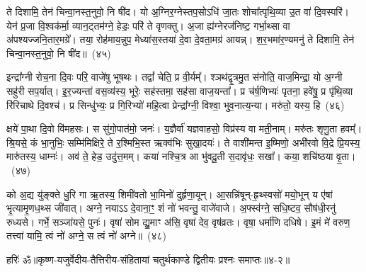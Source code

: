 ते दिशामि॒ तेन॑ चिन्वा॒नस्त॒नुवो॒ नि षी॑द। यो अ॒ग्निर॒ग्नेस्तप॒सो\-ऽधि॑ जा॒तः शोचा᳚त्पृथि॒व्या उ॒त वा॑ दि॒वस्परि॑। येन॑ प्र॒जा वि॒श्वक॑र्मा॒ व्यान॒ट्तम॑ग्ने॒ हेडः॒ परि॑ ते वृणक्तु। अ॒जा ह्य॑ग्नेरज॑निष्ट॒ गर्भा॒थ्सा वा अ॑पश्यज्जनि॒तार॒मग्रे᳚। तया॒ रोह॑माय॒न्नुप॒ मेध्या॑स॒स्तया॑ दे॒वा दे॒वता॒मग्र॑ आयन्न्। श॒र॒भमा॑र॒ण्यमनु॑ ते दिशामि॒ तेन॑ चिन्वा॒नस्त॒नुवो॒ नि षी॑द॥~(४५)\ip

{\anuvakamend[{अग्ने॒ मा हिꣳ॑सी॒रग्ने॒ मोष्ट्र॑मार॒ण्यमनु॑ शर॒भं नव॑ च}]}%

इन्द्रा᳚ग्नी रोच॒ना दि॒वः परि॒ वाजे॑षु भूषथः। तद्वां᳚ चेति॒ प्र वी॒र्यम्᳚। श्ञथ॑द्वृ॒त्रमु॒त स॑नोति॒ वाज॒मिन्द्रा॒ यो अ॒ग्नी सहु॑री सप॒र्यात्। इ॒र॒ज्यन्ता॑ वस॒व्य॑स्य॒ भूरेः॒ सह॑स्तमा॒ सह॑सा वाज॒यन्ता᳚। प्र च॑र्\mbox{}ष॒णिभ्यः॑ पृतना॒ हवे॑षु॒ प्र पृ॑थि॒व्या रि॑रिचाथे दि॒वश्च॑। प्र सिन्धु॑भ्यः॒ प्र गि॒रिभ्यो॑ महि॒त्वा प्रेन्द्रा᳚ग्नी॒ विश्वा॒ भुव॒नात्य॒न्या। मरु॑तो॒ यस्य॒ हि~(४६)\ip

क्षये॑ पा॒था दि॒वो वि॑महसः। स सु॑गो॒पात॑मो॒ जनः॑। य॒ज्ञैर्वा॑ यज्ञवाहसो॒ विप्र॑स्य वा मती॒नाम्। मरु॑तः शृणु॒ता हवम्᳚। श्रि॒यसे॒ कं भा॒नुभिः॒ सम्मि॑मिक्षिरे॒ ते र॒श्मिभि॒स्त ऋक्व॑भिः सुखा॒दयः॑। ते वाशी॑मन्त इ॒ष्मिणो॒ अभी॑रवो वि॒द्रे प्रि॒यस्य॒ मारु॑तस्य॒ धाम्नः॑। अव॑ ते॒ हेड॒ उदु॑त्त॒मम्। कया॑ नश्चि॒त्र आ भु॑वदू॒ती स॒दावृ॑धः॒ सखा᳚। कया॒ शचि॑ष्ठया वृ॒ता।~(४७)\ip

को अ॒द्य यु॑ङ्क्ते धु॒रि गा ऋ॒तस्य॒ शिमी॑वतो भा॒मिनो॑ दुर्\mbox{}हृणा॒यून्। आ॒सन्नि॑षून्-हृ॒थ्स्वसो॑ मयो॒भून् य ए॑षां भृ॒त्यामृ॒णध॒थ्स जी॑वात्। अग्ने॒ नयाऽऽ दे॒वाना॒ꣳ॒ शं नो॑ भवन्तु॒ वाजे॑वाजे। अ॒फ्स्व॑ग्ने॒ सधि॒ष्टव॒ सौष॑धी॒रनु॑ रुध्यसे। गर्भे॒ सञ्जा॑यसे॒ पुनः॑। वृषा॑ सोम द्यु॒माꣳ अ॑सि॒ वृषा॑ देव॒ वृष॑व्रतः। वृषा॒ धर्मा॑णि दधिषे। इ॒मं मे॑ वरुण॒ तत्त्वा॑ यामि॒ त्वं नो॑ अग्ने॒ स त्वं नो॑ अग्ने॥~(४८)\ip

{\anuvakamend[{हि वृ॒ता म॒ एका॑\-दश च}]}%

{हरिः॑ ॐ}{॥कृष्ण-यजुर्वेदीय-तैत्तिरीय-संहितायां चतुर्थकाण्डे द्वितीयः प्रश्नः समाप्तः॥४-२॥}


